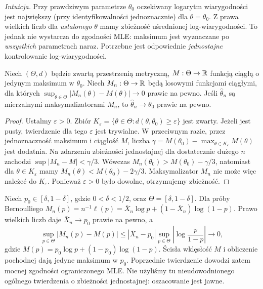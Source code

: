 \emph{Intuicja.} Przy prawdziwym parametrze $\theta_0$ oczekiwany
logarytm wiarygodności jest największy (przy identyfikowalności jednoznacznie)
dla $\theta=\theta_0$. Z prawa wielkich liczb dla \emph{ustalonego}
$\theta$ mamy zbieżność uśrednionej log-wiarygodności. To jednak nie
wystarcza do zgodności MLE: maksimum jest wyznaczane po \emph{wszystkich}
parametrach naraz. Potrzebne jest odpowiednie \emph{jednostajne}
kontrolowanie log-wiarygodności.

\begin{twierdzenie}\label{thm:argmax-consistency}
Niech $(\Theta,d)$ będzie zwartą przestrzenią metryczną,
$M:\Theta\to\mathbb R$ funkcją ciągłą o jedynym maksimum w $\theta_0$.
Niech $M_n:\Theta\to\mathbb R$ będą losowymi funkcjami ciągłymi, dla których
$\sup_{\theta\in\Theta}|M_n(\theta)-M(\theta)|\to0$ prawie na pewno.
Jeśli $\widehat\theta_n$ są mierzalnymi maksymalizatorami $M_n$, to
$\widehat\theta_n\to\theta_0$ prawie na pewno.
\end{twierdzenie}
\begin{proof}
Ustalmy $\varepsilon>0$. Zbiór
$K_\varepsilon=\{\theta\in\Theta:d(\theta,\theta_0)\ge\varepsilon\}$
jest zwarty. Jeżeli jest pusty, twierdzenie dla tego $\varepsilon$
jest trywialne. W przeciwnym razie, przez jednoznaczność maksimum
i ciągłość $M$, liczba
$\gamma=M(\theta_0)-\max_{\theta\in K_\varepsilon}M(\theta)$
jest dodatnia. Na zdarzeniu zbieżności jednostajnej dla dostatecznie
dużego $n$ zachodzi $\sup|M_n-M|<\gamma/3$.
Wówczas $M_n(\theta_0)>M(\theta_0)-\gamma/3$, natomiast dla
$\theta\in K_\varepsilon$ mamy
$M_n(\theta)<M(\theta_0)-2\gamma/3$.
Maksymalizator $M_n$ nie może więc należeć do $K_\varepsilon$.
Ponieważ $\varepsilon>0$ było dowolne, otrzymujemy zbieżność.
\end{proof}

\begin{przyklad}
Niech $p_0\in[\delta,1-\delta]$, gdzie $0<\delta<1/2$, oraz
$\Theta=[\delta,1-\delta]$. Dla próby Bernoulliego
$M_n(p)=n^{-1}\ell(p)=\bar X_n\log p+(1-\bar X_n)\log(1-p)$.
Prawo wielkich liczb daje $\bar X_n\to p_0$ prawie na pewno, a
\[
\sup_{p\in\Theta}|M_n(p)-M(p)|
\le |\bar X_n-p_0|
\sup_{p\in\Theta}\left|\log\frac p{1-p}\right|\longrightarrow0,
\]
gdzie $M(p)=p_0\log p+(1-p_0)\log(1-p)$.
Ścisła wklęsłość $M$ i obliczenie pochodnej dają jedyne maksimum
w $p_0$. Poprzednie twierdzenie dowodzi zatem mocnej zgodności
ograniczonego MLE. Nie użyliśmy tu nieudowodnionego ogólnego twierdzenia
o zbieżności jednostajnej: oszacowanie jest jawne.
\end{przyklad}

